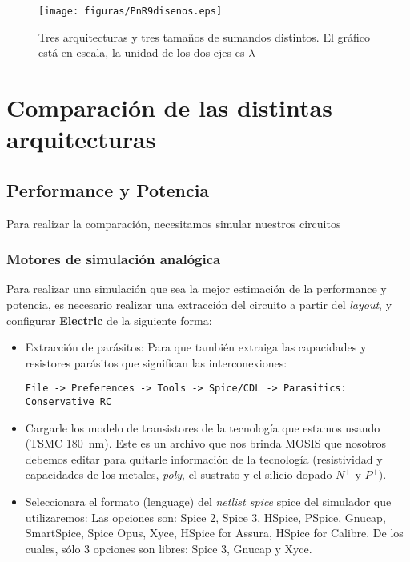 \begin{figure}[h]
\centering
\texttt{[image: figuras/PnR9disenos.eps]}
  \caption{Tres arquitecturas y tres tamaños de sumandos distintos. El gráfico está en escala, la unidad de los dos ejes es $\lambda$}
  \label{fig:diseños}
\end{figure}

\section{Comparación de las distintas arquitecturas}

\subsection{Performance y Potencia}
Para realizar la comparación, necesitamos simular nuestros circuitos
\subsubsection{Motores de simulación analógica}

Para realizar una simulación que sea la mejor estimación de la performance y potencia, es necesario realizar una extracción del circuito a partir del \emph{layout}, y configurar \textbf{Electric} de la siguiente forma:

\begin{itemize}
\item Extracción de parásitos: Para que también extraiga las capacidades y resistores parásitos que significan las interconexiones: \\
\begin{footnotesize}\verb.File -> Preferences -> Tools -> Spice/CDL -> Parasitics: Conservative RC. \end{footnotesize}
\item Cargarle los modelo de transistores de la tecnología que estamos usando (TSMC 180~nm). Este es un archivo que nos brinda MOSIS que nosotros debemos editar para quitarle información de la tecnología (resistividad y capacidades de los metales, \emph{poly}, el sustrato y el silicio dopado $N^+$ y $P^+$).
\item Seleccionara el formato (lenguage) del \emph{netlist spice} spice del simulador que utilizaremos: Las opciones son: Spice 2, Spice 3, HSpice, PSpice, Gnucap, SmartSpice,  Spice Opus, Xyce, HSpice for Assura, HSpice for Calibre. De los cuales, sólo 3 opciones son libres: Spice 3, Gnucap y Xyce.
\end{itemize}

